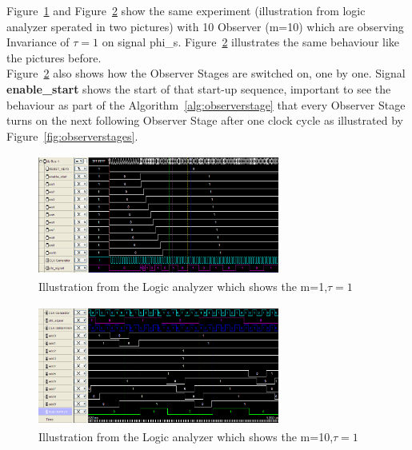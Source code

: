Figure~\ref{fig:logicanalyzer:m10:t1:1} and Figure~\ref{fig:logicanalyzer:m10:t1:2} show the same experiment (illustration from logic analyzer sperated in two pictures) 
with 10 Observer (m=10) which are observing Invariance of $\tau = 1$ on signal phi\_s. 
Figure~\ref{fig:logicanalyzer:m10:t1:2} illustrates the same behaviour like the pictures before. \\
Figure~\ref{fig:logicanalyzer:m10:t1:2} also shows how the Observer Stages are switched on, one by one. 
Signal \textbf{enable\_start} shows the start of that start-up sequence, important to see the behaviour as part of the Algorithm~\ref{alg:observerstage} that 
every Observer Stage turns on the next following Observer Stage after one clock cycle as illustrated by Figure~\ref{fig:observerstages}. \\
\begin{figure}[]
\centering
\includegraphics[width=300px,height=150px]{../../pictures/Logicanalyzer/10_Observer_Tau_1_2.png}
\caption[Logicanalyzer m=10,$\tau = 1$]{Illustration from the Logic analyzer which shows the m=1,$\tau = 1$}
\label{fig:logicanalyzer:m10:t1:1}
\end{figure}


\begin{figure}[]
\centering
\includegraphics[width=300px,height=150px]{../../pictures/Logicanalyzer/10_Observer_Tau_1_1.png}
\caption[Logicanalyzer m=10,$\tau = 1$]{Illustration from the Logic analyzer which shows the m=10,$\tau = 1$}
\label{fig:logicanalyzer:m10:t1:2}
\end{figure}

